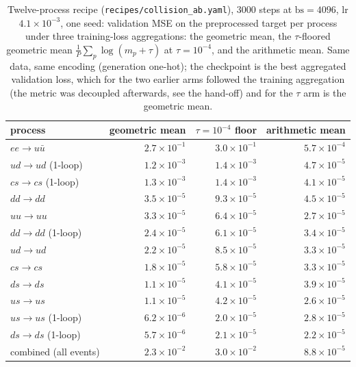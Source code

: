 \documentclass[11pt]{article}
\newcommand{\code}[1]{\texttt{#1}}
\begin{document}
\begin{table}[H]
\centering
\caption{Twelve-process recipe (\code{recipes/collision\_ab.yaml}), $3000$ steps at
$\mathrm{bs}=4096$, lr $4.1\times10^{-3}$, one seed: validation MSE on the preprocessed target
per process under three training-loss aggregations: the geometric mean, the $\tau$-floored
geometric mean $\frac1P\sum_p\log(m_p+\tau)$ at $\tau=10^{-4}$, and the arithmetic mean. Same
data, same encoding (generation one-hot); the checkpoint is the best aggregated validation loss,
which for the two earlier arms followed the training aggregation (the metric was decoupled
afterwards, see the hand-off) and for the $\tau$ arm is the geometric mean.}
\label{tab:agg_ab}
\begin{tabular}{@{}lrrr@{}}
\toprule
process & geometric mean & $\tau=10^{-4}$ floor & arithmetic mean \\
\midrule
$ee\to u\bar u$ & $2.7\times10^{-1}$ & $3.0\times10^{-1}$ & $5.7\times10^{-4}$ \\
$ud\to ud$ (1-loop) & $1.2\times10^{-3}$ & $1.4\times10^{-3}$ & $4.7\times10^{-5}$ \\
$cs\to cs$ (1-loop) & $1.3\times10^{-3}$ & $1.4\times10^{-3}$ & $4.1\times10^{-5}$ \\
$dd\to dd$ & $3.5\times10^{-5}$ & $9.3\times10^{-5}$ & $4.5\times10^{-5}$ \\
$uu\to uu$ & $3.3\times10^{-5}$ & $6.4\times10^{-5}$ & $2.7\times10^{-5}$ \\
$dd\to dd$ (1-loop) & $2.4\times10^{-5}$ & $6.1\times10^{-5}$ & $3.4\times10^{-5}$ \\
$ud\to ud$ & $2.2\times10^{-5}$ & $8.5\times10^{-5}$ & $3.3\times10^{-5}$ \\
$cs\to cs$ & $1.8\times10^{-5}$ & $5.8\times10^{-5}$ & $3.3\times10^{-5}$ \\
$ds\to ds$ & $1.1\times10^{-5}$ & $4.1\times10^{-5}$ & $3.9\times10^{-5}$ \\
$us\to us$ & $1.1\times10^{-5}$ & $4.2\times10^{-5}$ & $2.6\times10^{-5}$ \\
$us\to us$ (1-loop) & $6.2\times10^{-6}$ & $2.0\times10^{-5}$ & $2.8\times10^{-5}$ \\
$ds\to ds$ (1-loop) & $5.7\times10^{-6}$ & $2.1\times10^{-5}$ & $2.2\times10^{-5}$ \\
\midrule
combined (all events) & $2.3\times10^{-2}$ & $3.0\times10^{-2}$ & $8.8\times10^{-5}$ \\
\bottomrule
\end{tabular}
\end{table}
\end{document}
